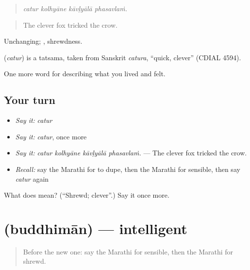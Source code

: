 \begin{quote}
\emph{catur kolhyāne kāvḷyālā phasavlaṁ.}
\end{quote}

\begin{quote}
The clever fox tricked the crow.
\end{quote}

Unchanging; , shrewdness.

\begin{cousinweb}
\textbf{} (\emph{catur}) is a tatsama, taken from Sanskrit \emph{catura}, \textquotedblleft{}quick, clever\textquotedblright{} (CDIAL 4594).
\end{cousinweb}

\begin{grammarlens}[title={What you've built}]
One more word for describing what you lived and felt.
\end{grammarlens}

\subsection*{Your turn}
\begin{itemize}
\raggedright
  \item \emph{Say it:} \emph{catur}
  \item \emph{Say it:} \emph{catur}, once more
  \item \emph{Say it:} \emph{catur kolhyāne kāvḷyālā phasavlaṁ.} — The clever fox tricked the crow.
  \item \emph{Recall:} say the Marathi for to dupe, then the Marathi for sensible, then say \emph{catur} again
\end{itemize}

\begin{tcolorbox}[breakable,colback=teal!4,colframe=teal!35!black,title={Before you move on}]
What does  mean? (\textquotedblleft{}Shrewd; clever\textquotedblright{}.) Say it once more.
\end{tcolorbox}
\section[\texorpdfstring{\mr{बुद्धिमान} (buddhimān)}{बुद्धिमान (buddhimān)}]{ (buddhimān) — intelligent}

\label{lesson:MR-C471-buddhiman}



\begin{quote}
Before the new one: say the Marathi for sensible, then the Marathi for shrewd.
\end{quote}

